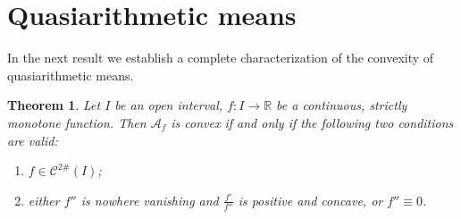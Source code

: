 \documentclass[12pt,oneside]{amsart}
\newtheorem{thm}{Theorem}[section]
\theoremstyle{definition}
\numberwithin{equation}{section}
\def\A{\mathscr{A}}
\def\Cts{\mathcal{C}^{2\#}}
\newcommand\R{\mathbb{R}}
\newcommand{\QA}[1]{\A_{#1}}
\begin{document}
\section{Quasiarithmetic means\label{sec:qa}}

In the next result we establish a complete characterization of the convexity of quasiarithmetic means.
 
 \begin{thm}\label{thm:QAconvex}
 Let $I$ be an open interval, $f \colon I \to \R$ be a continuous, strictly monotone function. Then $\QA{f}$ is convex if and only if the following two conditions are valid:
 \begin{enumerate}
  \item $f \in \Cts(I)$;
  \item either $f''$ is nowhere vanishing and $\frac{f'}{f''}$ is positive and concave, or $f'' \equiv 0$.
 \end{enumerate}
 \end{thm}
\end{document}
